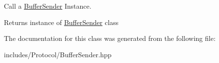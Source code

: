 Call a \hyperlink{classspider_1_1_buffer_sender}{Buffer\+Sender} Instance. 

\begin{DoxyReturn}{Returns}
instance of \hyperlink{classspider_1_1_buffer_sender}{Buffer\+Sender} class 
\end{DoxyReturn}


The documentation for this class was generated from the following file\+:\begin{DoxyCompactItemize}
\item 
includes/\+Protocol/Buffer\+Sender.\+hpp\end{DoxyCompactItemize}
